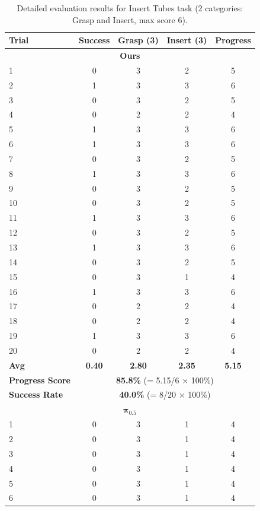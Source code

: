 \documentclass[onecolumn]{robbyant}           %
\begin{document}
\begin{table}[t]
\centering
\caption{Detailed evaluation results for Insert Tubes task (2 categories: Grasp and Insert, max score 6).}
\label{tab:realworld_detailed_insert_tubes}
\scriptsize
\begin{tabular}{l|c|cc|c}
\toprule
\textbf{Trial} & \textbf{Success} & \textbf{Grasp (3)} & \textbf{Insert (3)} & \textbf{Progress} \\
\midrule
\multicolumn{5}{c}{\textbf{Ours}} \\
\midrule
1  & 0 & 3 & 2 & 5 \\
2  & 1 & 3 & 3 & 6 \\
3  & 0 & 3 & 2 & 5 \\
4  & 0 & 2 & 2 & 4 \\
5  & 1 & 3 & 3 & 6 \\
6  & 1 & 3 & 3 & 6 \\
7  & 0 & 3 & 2 & 5 \\
8  & 1 & 3 & 3 & 6 \\
9  & 0 & 3 & 2 & 5 \\
10 & 0 & 3 & 2 & 5 \\
11 & 1 & 3 & 3 & 6 \\
12 & 0 & 3 & 2 & 5 \\
13 & 1 & 3 & 3 & 6 \\
14 & 0 & 3 & 2 & 5 \\
15 & 0 & 3 & 1 & 4 \\
16 & 1 & 3 & 3 & 6 \\
17 & 0 & 2 & 2 & 4 \\
18 & 0 & 2 & 2 & 4 \\
19 & 1 & 3 & 3 & 6 \\
20 & 0 & 2 & 2 & 4 \\
\midrule
\textbf{Avg} & \textbf{0.40} & \textbf{2.80} & \textbf{2.35} & \textbf{5.15} \\
\textbf{Progress Score} & \multicolumn{4}{c}{\textbf{85.8\%} (= 5.15/6 $\times$ 100\%)} \\
\textbf{Success Rate} & \multicolumn{4}{c}{\textbf{40.0\%} (= 8/20 $\times$ 100\%)} \\
\midrule
\multicolumn{5}{c}{$\boldsymbol{\pi_{0.5}}$} \\
\midrule
1  & 0 & 3 & 1 & 4 \\
2  & 0 & 3 & 1 & 4 \\
3  & 0 & 3 & 1 & 4 \\
4  & 0 & 3 & 1 & 4 \\
5  & 0 & 3 & 1 & 4 \\
6  & 0 & 3 & 1 & 4 \\

\end{tabular}
\end{table}
\end{document}
